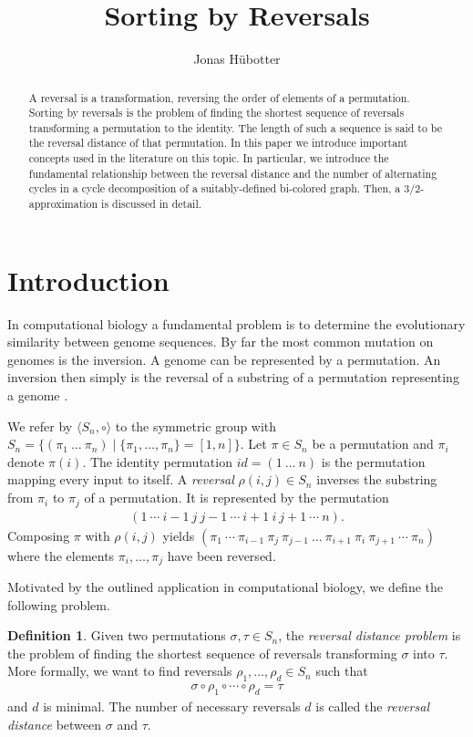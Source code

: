 \documentclass[11pt,DIV=11]{scrartcl}
\title{Sorting by Reversals}
\author{Jonas Hübotter}
\theoremstyle{definition}
\newtheorem{definition}[theorem]{Definition}
\theoremstyle{remark}
\begin{document}
\maketitle

\begin{abstract}
    A reversal is a transformation, reversing the order of elements of a permutation. Sorting by reversals is the problem of finding the shortest sequence of reversals transforming a permutation to the identity. The length of such a sequence is said to be the reversal distance of that permutation. In this paper we introduce important concepts used in the literature on this topic. In particular, we introduce the fundamental relationship between the reversal distance and the number of alternating cycles in a cycle decomposition of a suitably-defined bi-colored graph. Then, a $3/2$-approximation is discussed in detail.
\end{abstract}

\section{Introduction}

In computational biology a fundamental problem is to determine the evolutionary similarity between genome sequences. By far the most common mutation on genomes is the inversion. A genome can be represented by a permutation. An inversion then simply is the reversal of a substring of a permutation representing a genome \cite{Kececioglu1995}.

We refer by $\langle S_n, \circ \rangle$ to the symmetric group with $S_n = \{(\pi_1\ \dots\ \pi_n) \mid \{\pi_1, \dots, \pi_n\} = [1,n]\}$. Let $\pi \in S_n$ be a permutation and $\pi_i$ denote $\pi(i)$. The identity permutation $id = (1\ \dots\ n)$ is the permutation mapping every input to itself. A \textit{reversal} $\rho(i,j) \in S_n$ inverses the substring from $\pi_i$ to $\pi_j$ of a permutation. It is represented by the permutation
\begin{align*}
    (1\ \cdots\ i-1\ j\ j-1\ \cdots\ i+1\ i\ j+1\ \cdots\ n).
\end{align*}
Composing $\pi$ with $\rho(i,j)$ yields $(\pi_1\ \cdots\ \pi_{i-1}\ \pi_j\ \pi_{j-1}\ \dots\ \pi_{i+1}\ \pi_i\ \pi_{j+1}\ \cdots\ \pi_n)$ where the elements $\pi_i, \dots, \pi_j$ have been reversed.

Motivated by the outlined application in computational biology, we define the following problem.

\begin{definition}
Given two permutations $\sigma, \tau \in S_n$, the \textit{reversal distance problem} is the problem of finding the shortest sequence of reversals transforming $\sigma$ into $\tau$. More formally, we want to find reversals $\rho_1, \dots, \rho_d \in S_n$ such that
\begin{align*}
    \sigma \circ \rho_1 \circ \cdots \circ \rho_d = \tau
\end{align*}
and $d$ is minimal.
The number of necessary reversals $d$ is called the \textit{reversal distance} between $\sigma$ and $\tau$.
\end{definition}
\end{document}
